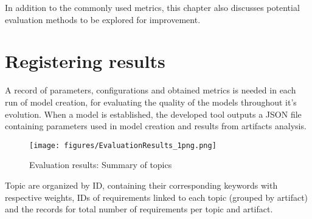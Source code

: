 
In addition to the commonly used metrics, this chapter also discusses potential evaluation methods to be explored for improvement.



\section{Registering results}



A record of parameters, configurations and obtained metrics is needed in each run of model creation, for evaluating the quality of the models throughout it's evolution. When a  model is established, the developed tool outputs a JSON file containing parameters used in model creation and results from artifacts analysis.

\begin{figure}[h]
    \centering
    \texttt{[image: figures/EvaluationResults\_1png.png]}
    \caption{Evaluation results: Summary of topics}
    \label{fig:EvaluationResults_1png}
\end{figure}

Topic are organized by ID, containing their corresponding keywords with respective weights, IDs of requirements linked to each topic (grouped by artifact) and the records for total number of requirements per topic and artifact. 

